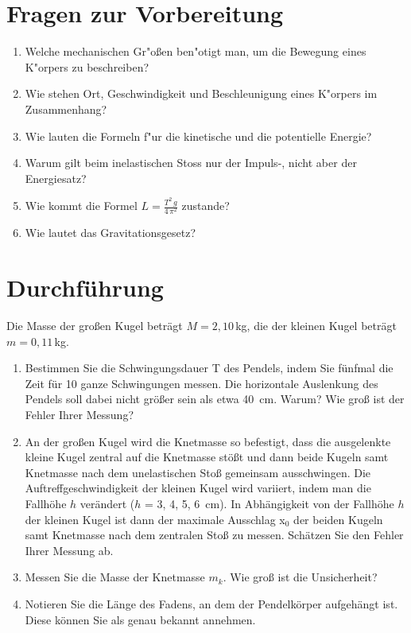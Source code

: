 \section{Fragen zur Vorbereitung}

\begin{enumerate} 
 \item Welche mechanischen Gr"o{\ss}en ben"otigt man, um die Bewegung eines K"orpers zu beschreiben?
 \item Wie stehen Ort, Geschwindigkeit und Beschleunigung eines K"orpers im Zusammenhang?
 \item Wie lauten die Formeln f"ur die kinetische und die potentielle Energie?
 \item Warum gilt beim inelastischen Stoss nur der Impuls-, nicht aber der Energiesatz?
 \item Wie kommt die Formel $L=\frac{T^2\,g}{4\,\pi^2}$ zustande?
 \item Wie lautet das Gravitationsgesetz?
\end{enumerate} 

\section{Durchführung} 

Die Masse der großen Kugel beträgt $M = 2,10$\,kg, die der kleinen Kugel beträgt $m=0,11$\,kg.

\begin{enumerate}
%
\item Bestimmen Sie die Schwingungsdauer T des Pendels, indem Sie fünfmal die Zeit für 10 ganze Schwingungen messen. Die horizontale Auslenkung des Pendels soll dabei nicht größer sein als etwa 40~cm. Warum? Wie groß ist der Fehler Ihrer Messung? \label{Mess:Schwingungsdauer}
%
\item An der großen Kugel wird die Knetmasse so befestigt, dass die ausgelenkte kleine Kugel zentral auf die Knetmasse stößt und dann beide Kugeln samt Knetmasse nach dem unelastischen Stoß gemeinsam ausschwingen. Die Auftreffgeschwindigkeit der kleinen Kugel wird variiert, indem man die Fallhöhe $h$ verändert ($h$ = 3, 4, 5, 6~cm). In Abhängigkeit von der Fallhöhe $h$ der kleinen Kugel ist dann der maximale Ausschlag x$_0$ der beiden Kugeln samt Knetmasse nach dem zentralen Stoß zu messen. Schätzen Sie den Fehler Ihrer Messung ab.
\label{Mess:inelast_Stoss}
%
\item Messen Sie die Masse der Knetmasse $m_k$. Wie groß ist die Unsicherheit?
%
\item Notieren Sie die Länge des Fadens, an dem der Pendelkörper aufgehängt ist. Diese können Sie als genau bekannt annehmen.
%
\end{enumerate}

